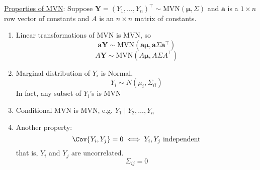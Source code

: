 \underline{Properties of MVN}:
Suppose $ \symbf{Y}=(Y_1,\ldots,Y_n)^\top \sim \text{MVN}(\symbf{\mu},\Sigma) $
and $ \symbf{a} $ is a $ 1\times n $ row vector of constants
and $ A $ is an $ n\times n  $ matrix of constants.
\begin{enumerate}
    \item Linear transformations of MVN is MVN, so
          \[ \symbf{a}\symbf{Y}\sim \text{MVN}(\symbf{a}\symbf{\mu},\symbf{a}
              \Sigma\symbf{a}^\top) \]
          \[ A\symbf{Y} \sim \text{MVN}(A\symbf{\mu},A\Sigma A^\top) \]
    \item Marginal distribution of $ Y_i $ is
          Normal,
          \[ Y_i \sim N(\mu_i,\Sigma_{ii}) \]
          In fact, any subset of $ Y_i $'s is MVN
    \item Conditional MVN is MVN, e.g. $ Y_1\mid Y_2,\ldots,Y_n $
    \item Another property:
          \[ \Cov{Y_i,Y_j}=0\iff Y_i,Y_j\text{ independent} \]
          that is, $ Y_i $ and $ Y_j $ are uncorrelated.
          \[ \Sigma_{ij}=0 \]

\end{enumerate}
